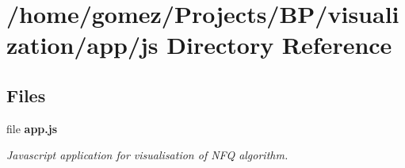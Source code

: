 \section{/home/gomez/\+Projects/\+B\+P/visualization/app/js Directory Reference}
\label{dir_2b493f73f60745dd5b2b8215e6fa237e}
\subsection*{Files}
\begin{DoxyCompactItemize}
\item 
file {\bf app.\+js}
\begin{DoxyCompactList}\small\item\em Javascript application for visualisation of N\+F\+Q algorithm. \end{DoxyCompactList}\end{DoxyCompactItemize}
